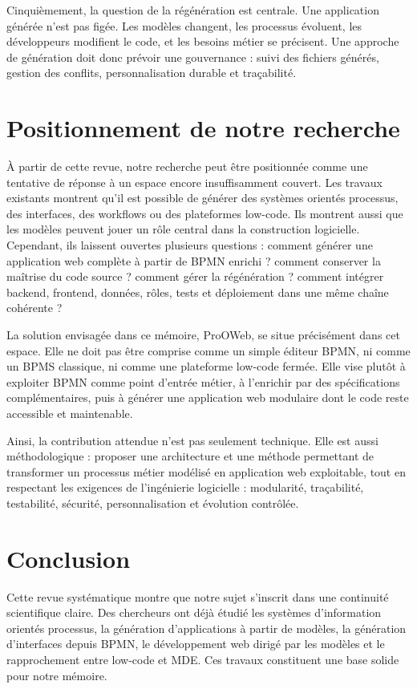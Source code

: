 \documentclass[12pt,a4paper]{article}
\begin{document}
Cinquièmement, la question de la régénération est centrale. Une application générée n'est pas figée. Les modèles changent, les processus évoluent, les développeurs modifient le code, et les besoins métier se précisent. Une approche de génération doit donc prévoir une gouvernance : suivi des fichiers générés, gestion des conflits, personnalisation durable et traçabilité.

\section{Positionnement de notre recherche}

À partir de cette revue, notre recherche peut être positionnée comme une tentative de réponse à un espace encore insuffisamment couvert. Les travaux existants montrent qu'il est possible de générer des systèmes orientés processus, des interfaces, des workflows ou des plateformes low-code. Ils montrent aussi que les modèles peuvent jouer un rôle central dans la construction logicielle. Cependant, ils laissent ouvertes plusieurs questions : comment générer une application web complète à partir de BPMN enrichi ? comment conserver la maîtrise du code source ? comment gérer la régénération ? comment intégrer backend, frontend, données, rôles, tests et déploiement dans une même chaîne cohérente ?

La solution envisagée dans ce mémoire, ProOWeb, se situe précisément dans cet espace. Elle ne doit pas être comprise comme un simple éditeur BPMN, ni comme un BPMS classique, ni comme une plateforme low-code fermée. Elle vise plutôt à exploiter BPMN comme point d'entrée métier, à l'enrichir par des spécifications complémentaires, puis à générer une application web modulaire dont le code reste accessible et maintenable.

Ainsi, la contribution attendue n'est pas seulement technique. Elle est aussi méthodologique : proposer une architecture et une méthode permettant de transformer un processus métier modélisé en application web exploitable, tout en respectant les exigences de l'ingénierie logicielle : modularité, traçabilité, testabilité, sécurité, personnalisation et évolution contrôlée.

\section{Conclusion}

Cette revue systématique montre que notre sujet s'inscrit dans une continuité scientifique claire. Des chercheurs ont déjà étudié les systèmes d'information orientés processus, la génération d'applications à partir de modèles, la génération d'interfaces depuis BPMN, le développement web dirigé par les modèles et le rapprochement entre low-code et MDE. Ces travaux constituent une base solide pour notre mémoire.
\end{document}
